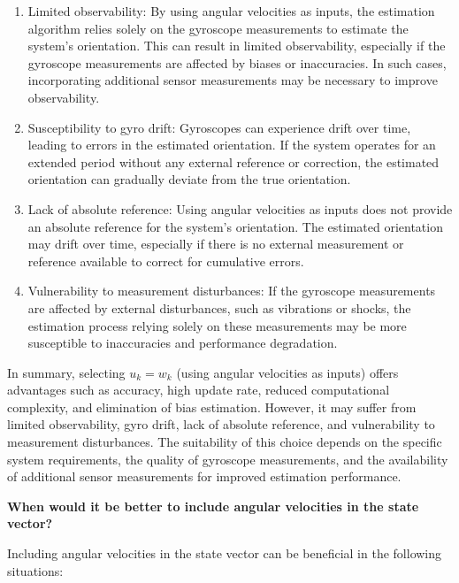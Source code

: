 \begin{enumerate}
  \item Limited observability: By using angular velocities as inputs, the estimation algorithm relies solely on the gyroscope measurements to estimate the system's orientation. This can result in limited observability, especially if the gyroscope measurements are affected by biases or inaccuracies. In such cases, incorporating additional sensor measurements may be necessary to improve observability.
  
  \item Susceptibility to gyro drift: Gyroscopes can experience drift over time, leading to errors in the estimated orientation. If the system operates for an extended period without any external reference or correction, the estimated orientation can gradually deviate from the true orientation.
  
  \item Lack of absolute reference: Using angular velocities as inputs does not provide an absolute reference for the system's orientation. The estimated orientation may drift over time, especially if there is no external measurement or reference available to correct for cumulative errors.
  
  \item Vulnerability to measurement disturbances: If the gyroscope measurements are affected by external disturbances, such as vibrations or shocks, the estimation process relying solely on these measurements may be more susceptible to inaccuracies and performance degradation.
\end{enumerate}

In summary, selecting $u_k = w_k$ (using angular velocities as inputs) offers advantages such as accuracy, high update rate, reduced computational complexity, and elimination of bias estimation. However, it may suffer from limited observability, gyro drift, lack of absolute reference, and vulnerability to measurement disturbances. The suitability of this choice depends on the specific system requirements, the quality of gyroscope measurements, and the availability of additional sensor measurements for improved estimation performance.



\textbf{When would it be better to include angular velocities in the state vector?}

Including angular velocities in the state vector can be beneficial in the following situations:

